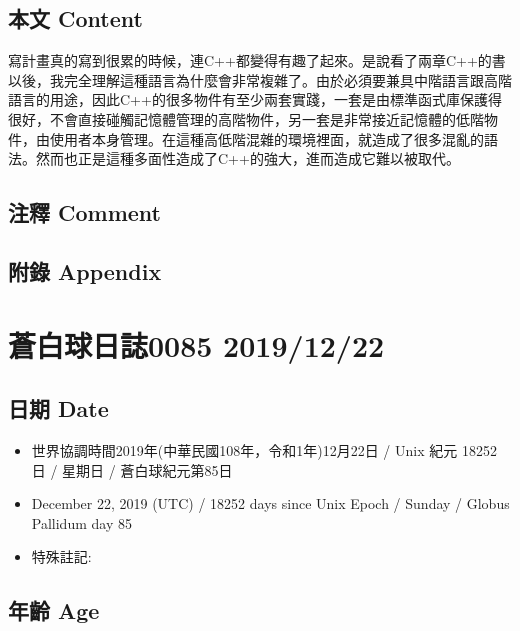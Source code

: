 \documentclass[
]{article}
\providecommand{\tightlist}{%
  \setlength{\itemsep}{0pt}\setlength{\parskip}{0pt}}
\begin{document}
\hypertarget{ux672cux6587-content-20}{%
\subsection{本文 Content}\label{ux672cux6587-content-20}}

寫計畫真的寫到很累的時候，連C++都變得有趣了起來。是說看了兩章C++的書以後，我完全理解這種語言為什麼會非常複雜了。由於必須要兼具中階語言跟高階語言的用途，因此C++的很多物件有至少兩套實踐，一套是由標準函式庫保護得很好，不會直接碰觸記憶體管理的高階物件，另一套是非常接近記憶體的低階物件，由使用者本身管理。在這種高低階混雜的環境裡面，就造成了很多混亂的語法。然而也正是這種多面性造成了C++的強大，進而造成它難以被取代。

\hypertarget{ux6ce8ux91cb-comment-19}{%
\subsection{注釋 Comment}\label{ux6ce8ux91cb-comment-19}}

\hypertarget{ux9644ux9304-appendix-20}{%
\subsection{附錄 Appendix}\label{ux9644ux9304-appendix-20}}

\hypertarget{ux84bcux767dux7403ux65e5ux8a8c0085-20191222}{%
\section{蒼白球日誌0085
2019/12/22}\label{ux84bcux767dux7403ux65e5ux8a8c0085-20191222}}

\hypertarget{ux65e5ux671f-date-21}{%
\subsection{日期 Date}\label{ux65e5ux671f-date-21}}

\begin{itemize}
\tightlist
\item
  世界協調時間2019年(中華民國108年，令和1年)12月22日 / Unix 紀元 18252
  日 / 星期日 / 蒼白球紀元第85日
\item
  December 22, 2019 (UTC) / 18252 days since Unix Epoch / Sunday /
  Globus Pallidum day 85
\item
  特殊註記:
\end{itemize}

\hypertarget{ux5e74ux9f61-age-21}{%
\subsection{年齡 Age}\label{ux5e74ux9f61-age-21}}
\end{document}
